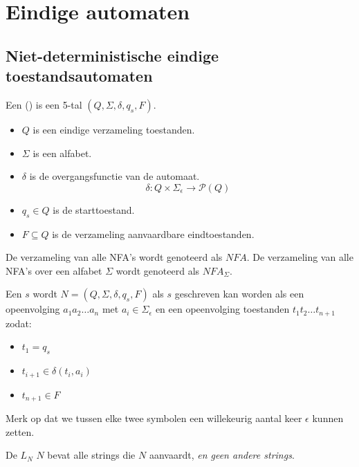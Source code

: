 \documentclass[main.tex]{subfiles}
\begin{document}
\chapter{Eindige automaten}
\label{cha:eindige-automaten}

\section{Niet-deterministische eindige toestandsautomaten}
\label{sec:niet-deterministische-eindige-automaten}

\begin{de}
  Een  () is een 5-tal $(Q,\Sigma,\delta,q_{s},F)$.
  \begin{itemize}
  \item $Q$ is een eindige verzameling toestanden.
  \item $\Sigma$ is een alfabet.
  \item $\delta$ is de overgangsfunctie van de automaat.
  \[ \delta: Q \times \Sigma_{\epsilon} \rightarrow \mathcal{P}(Q) \]
  \item $q_{s} \in Q$ is de starttoestand.
  \item $F \subseteq Q$ is de verzameling aanvaardbare eindtoestanden.
  \end{itemize}
\end{de}

\begin{de}
  De verzameling van alle NFA's wordt genoteerd als $NFA$.
  De verzameling van alle NFA's over een alfabet $\Sigma$ wordt genoteerd als $NFA_{\Sigma}$.
\end{de}

\begin{de}
  Een  $s$ wordt  $N=(Q,\Sigma,\delta,q_{s},F)$ als $s$ geschreven kan worden als een opeenvolging $a_{1}a_{2}\ldots a_{n}$ met $a_{i} \in \Sigma_{\epsilon}$ en een opeenvolging toestanden $t_{1}t_{2}\ldots t_{n+1}$ zodat:
  \begin{itemize}
  \item $t_{1} = q_{s}$
  \item $t_{i+1} \in \delta(t_{i},a_{i})$
  \item $t_{n+1} \in F$
  \end{itemize}
  Merk op dat we tussen elke twee symbolen een willekeurig aantal keer $\epsilon$ kunnen zetten.
\end{de}

\begin{de}
  De  $L_{N}$  $N$ bevat alle strings die $N$ aanvaardt, \textit{en geen andere strings}.
\end{de}
\end{document}
